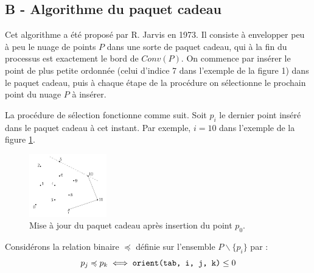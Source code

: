 \documentclass[a4paper,french,bookmarks]{article}
\begin{document}
\subsection*{B - Algorithme du paquet cadeau}

Cet algorithme a été proposé par R. Jarvis en 1973. Il consiste à envelopper peu à peu le nuage de points $P$ dans une sorte de paquet cadeau, qui à la fin du processus est exactement le bord de $Conv(P)$. On commence par insérer le point de plus petite ordonnée (celui d’indice 7 dans l’exemple de la figure 1) dans le paquet cadeau, puis à chaque étape de la procédure on sélectionne le prochain point du nuage $P$ à insérer. 

La procédure de sélection fonctionne comme suit. Soit $p_i$ le dernier point inséré dans le paquet cadeau à cet instant. Par exemple, $i = 10$ dans l’exemple de la figure \ref{fig:fig3}.

\begin{figure}[!ht]
    \centering
    \includegraphics[width=0.3\textwidth]{dm1/figure3.jpg}
    \caption{Mise à jour du paquet cadeau après insertion du point $p_0$.}
    \label{fig:fig3}
\end{figure}

Considérons la relation binaire $\preccurlyeq$ définie sur l’ensemble $P\backslash\{p_i\}$ par :
\[ p_j \preccurlyeq p_k \iff \verb|orient(tab, i, j, k)| \leq 0\]
\end{document}
